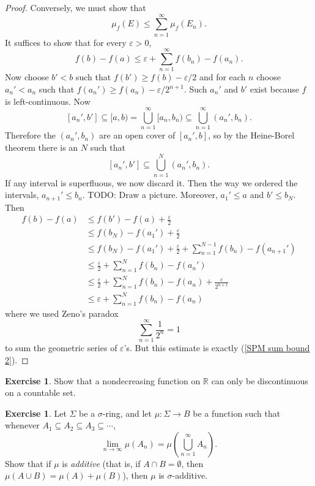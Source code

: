 \documentclass[12pt]{book}
\newcommand{\RR}{\mathbb{R}}
\newcommand{\dfn}[1]{\emph{#1}\index{#1}}
\theoremstyle{definition}
\newtheorem{exercise}[theorem]{Exercise}
\begin{document}
\begin{proof}
Conversely, we must show that
$$\mu_f(E) \leq \sum_{n=1}^\infty \mu_f(E_n).$$
It suffices to show that for every $\varepsilon > 0$,
\begin{equation}
\label{SPM sum bound 2}
f(b) - f(a) \leq \varepsilon + \sum_{n=1}^\infty f(b_n) - f(a_n).
\end{equation}
Now choose $b' < b$ such that $f(b') \geq f(b) - \varepsilon/2$ and for each $n$ choose $a_n' < a_n$ such that $f(a_n') \geq f(a_n) - \varepsilon/2^{n+1}$.
Such $a_n'$ and $b'$ exist because $f$ is left-continuous.
Now
$$[a_n', b'] \subseteq [a, b) = \bigcup_{n=1}^\infty [a_n, b_n) \subseteq \bigcup_{n=1}^\infty (a_n', b_n).$$
Therefore the $(a_n', b_n)$ are an open cover of $[a_n', b]$, so by the Heine-Borel theorem there is an $N$ such that
$$[a_n', b'] \subseteq \bigcup_{n=1}^N (a_n', b_n).$$
If any interval is superfluous, we now discard it.
Then the way we ordered the intervals, $a_{n+1}' \leq b_n$.
TODO: Draw a picture.
Moreover, $a_1' \leq a$ and $b' \leq b_N$. Then
\begin{align*}
f(b) - f(a) &\leq f(b') - f(a) + \frac{\varepsilon}{2}\\
& \leq f(b_N) - f(a_1') + \frac{\varepsilon}{2}\\
& \leq f(b_N) - f(a_1') + \frac{\varepsilon}{2} + \sum_{n=1}^{N-1} f(b_n) - f(a_{n+1}')\\
& \leq \frac{\varepsilon}{2} + \sum_{n=1}^N f(b_n) - f(a_n')\\
& \leq \frac{\varepsilon}{2} + \sum_{n=1}^N f(b_n) - f(a_n) + \frac{\varepsilon}{2^{n+1}}\\
& \leq \varepsilon + \sum_{n=1}^N f(b_n) - f(a_n)
\end{align*}
where we used Zeno's paradox
\begin{equation}
\label{zeno}
\sum_{n=1}^\infty \frac{1}{2^n} = 1
\end{equation}
to sum the geometric series of $\varepsilon$'s.
But this estimate is exactly (\ref{SPM sum bound 2}).
\end{proof}

\begin{exercise}
\label{nondecreasing exercise}
Show that a nondecreasing function on $\RR$ can only be discontinuous on a countable set.
\end{exercise}

\begin{exercise}
Let $\Sigma$ be a $\sigma$-ring, and let $\mu: \Sigma \to B$ be a function such that whenever $A_1 \subseteq A_2 \subseteq A_3 \subseteq \cdots$,
$$\lim_{n \to \infty} \mu(A_n) = \mu\left(\bigcup_{n=1}^\infty A_n\right).$$
Show that if $\mu$ is \dfn{additive} (that is, if $A \cap B = \emptyset$, then $\mu(A \cup B) = \mu(A) + \mu(B)$), then $\mu$ is $\sigma$-additive.
\end{exercise}
\end{document}

